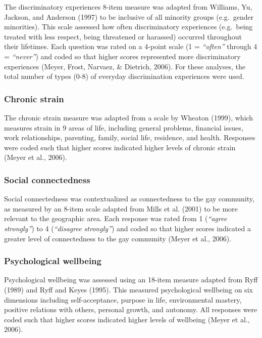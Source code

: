\documentclass[
  english,
  man,floatsintext]{apa6}
\begin{document}
The discriminatory experiences 8-item measure was adapted from Williams, Yu, Jackson, and Anderson (1997) to be inclusive of all minority groups (e.g.~gender minorities). This scale assessed how often discriminatory experiences (e.g.~being treated with less respect, being threatened or harassed) occurred throughout their lifetimes. Each question was rated on a 4-point scale (1 = \emph{\enquote{often}} through 4 = \emph{\enquote{never}}) and coded so that higher scores represented more discriminatory experiences (Meyer, Frost, Narvaez, \& Dietrich, 2006). For these analyses, the total number of types (0-8) of everyday discrimination experiences were used.

\hypertarget{chronic-strain}{%
\subsubsection{Chronic strain}\label{chronic-strain}}

The chronic strain measure was adapted from a scale by Wheaton (1999), which measures strain in 9 areas of life, including general problems, financial issues, work relationships, parenting, family, social life, residence, and health. Responses were coded such that higher scores indicated higher levels of chronic strain (Meyer et al., 2006).

\hypertarget{social-connectedness}{%
\subsubsection{Social connectedness}\label{social-connectedness}}

Social connectedness was contextualized as connectedness to the gay community, as measured by an 8-item scale adapted from Mills et al. (2001) to be more relevant to the geographic area. Each response was rated from 1 (\emph{\enquote{agree strongly}}) to 4 (\emph{\enquote{disagree strongly}}) and coded so that higher scores indicated a greater level of connectedness to the gay community (Meyer et al., 2006).

\hypertarget{psychological-wellbeing}{%
\subsubsection{Psychological wellbeing}\label{psychological-wellbeing}}

Psychological wellbeing was assessed using an 18-item measure adapted from Ryff (1989) and Ryff and Keyes (1995). This measured psychological wellbeing on six dimensions including self-acceptance, purpose in life, environmental mastery, positive relations with others, personal growth, and autonomy. All responses were coded such that higher scores indicated higher levels of wellbeing (Meyer et al., 2006).
\end{document}
